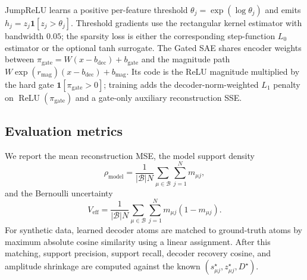 JumpReLU learns a positive per-feature threshold
$\theta_j=\exp(\log\theta_j)$ and emits
$h_j=z_j\mathbf{1}[z_j>\theta_j]$.  Threshold gradients use the rectangular
kernel estimator with bandwidth $0.05$; the sparsity loss is either the
corresponding step-function $L_0$ estimator or the optional tanh surrogate.
The Gated SAE shares encoder weights between
$\pi_{\mathrm{gate}}=W(x-b_{\mathrm{dec}})+b_{\mathrm{gate}}$ and the magnitude
path $W\exp(r_{\mathrm{mag}})(x-b_{\mathrm{dec}})+b_{\mathrm{mag}}$.  Its code
is the ReLU magnitude multiplied by the hard gate
$\mathbf{1}[\pi_{\mathrm{gate}}>0]$; training adds the decoder-norm-weighted
$L_1$ penalty on $\operatorname{ReLU}(\pi_{\mathrm{gate}})$ and a gate-only
auxiliary reconstruction SSE.

\subsection{Evaluation metrics}
\label{sec:vg_sae_metrics}

We report the mean reconstruction MSE, the model support density
\begin{equation}
    \rho_{\mathrm{model}}
    =
    \frac{1}{|\mathcal{B}|N}
    \sum_{\mu \in \mathcal{B}}\sum_{j=1}^{N}m_{\mu j},
\end{equation}
and the Bernoulli uncertainty
\begin{equation}
    V_{\mathrm{eff}}
    =
    \frac{1}{|\mathcal{B}|N}
    \sum_{\mu \in \mathcal{B}}\sum_{j=1}^{N}
    m_{\mu j}(1-m_{\mu j}).
\end{equation}
For synthetic data, learned decoder atoms are matched to ground-truth atoms by
maximum absolute cosine similarity using a linear assignment. After this
matching, support precision, support recall, decoder recovery cosine, and
amplitude shrinkage are computed against the known
$(s^\star_{\mu j}, z^\star_{\mu j}, D^\star)$.

